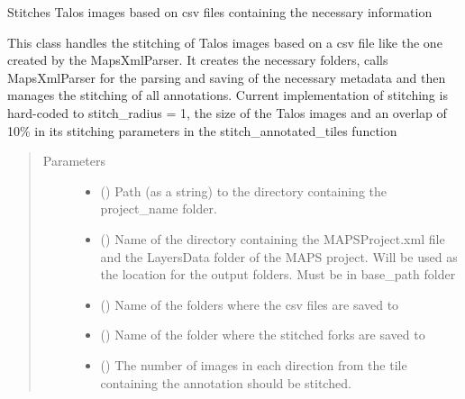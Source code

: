 \documentclass[letterpaper,10pt,english]{sphinxmanual}
\begin{document}
\begin{fulllineitems}
\label{\detokenize{index:stitch_MAPS_annotations.Stitcher}}
Stitches Talos images based on csv files containing the necessary information

This class handles the stitching of Talos images based on a csv file like the one created by the MapsXmlParser.
It creates the necessary folders, calls MapsXmlParser for the parsing and saving of the necessary metadata and then
manages the stitching of all annotations. Current implementation of stitching is hard-coded to stitch\_radius = 1,
the size of the Talos images and an overlap of 10\% in its stitching parameters in the stitch\_annotated\_tiles
function
\begin{quote}\begin{description}
\item[{Parameters}] \leavevmode\begin{itemize}
\item {} 
 () \textendash{} Path (as a string) to the directory containing the project\_name folder.

\item {} 
 () \textendash{} Name of the directory containing the MAPSProject.xml file and the LayersData
folder of the MAPS project. Will be used as the location for the output folders. Must be in base\_path folder

\item {} 
 () \textendash{} Name of the folders where the csv files are saved to

\item {} 
 () \textendash{} Name of the folder where the stitched forks are saved to

\item {} 
 () \textendash{} The number of images in each direction from the tile containing the annotation should be
stitched.


\end{itemize}
\end{description}
\end{quote}
\end{fulllineitems}
\end{document}
